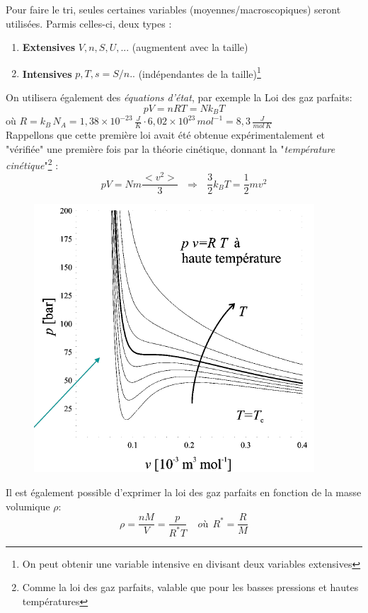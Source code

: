 \documentclass[british,french,11pt, a4paper, openany]{book}
\begin{document}
	Pour faire le tri, seules certaines variables (moyennes/macroscopiques) seront utilisées. Parmis celles-ci, deux types :
	\begin{enumerate}
		\item \textbf{Extensives} $V, n, S, U, ...$ (augmentent avec la taille)
		\item \textbf{Intensives} $p, T, s = S/n..$ (indépendantes de la taille)\footnote{On peut obtenir une variable intensive en divisant deux variables extensives}
	\end{enumerate}
	On utilisera également des \textit{équations d'état}, par exemple la Loi des gaz parfaits:
	\begin{equation}
	pV = nRT = Nk_BT
	\end{equation}
	où $R =k_B\,N_A=1,38\times 10^{-23}\,\frac{J}{K}\cdot 6,02\times 10^{23}\,mol^{-1}=8,3\,\frac{J}{mol\, K}$\\
	Rappellons que cette première loi avait été obtenue expérimentalement et "vérifiée" une première fois par la théorie cinétique, donnant la "\textit{température cinétique}"\footnote{Comme la loi des gaz parfaits, valable que pour les basses pressions et hautes températures} :
	\begin{equation}
	pV = Nm\frac{<v^2>}{3}\ \ \ \Rightarrow\ \ \ \frac{3}{2}k_BT = \frac{1}{2}mv^2
	\end{equation}
	\begin{figure}
		\includegraphics[scale=0.5]{cp/image2.png}
	\end{figure}
	Il est également possible d'exprimer la loi des gaz parfaits en fonction de la masse volumique $\rho$:
	\begin{equation}
	\rho = \frac{nM}{V} = \frac{p}{R^*T}\ \ \ \ \ où\ \ R^* = \frac{R}{M}
	\end{equation}
	
\end{document}

